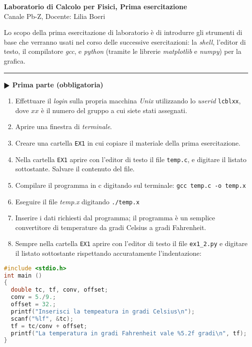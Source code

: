 \documentclass[11pt]{article}
\begin{document}
\pagestyle{empty}

\begin{center}
{\Large \bf  Laboratorio di Calcolo per Fisici, Prima esercitazione\\[2mm]}
{\large Canale Pb-Z, Docente: Lilia Boeri}
\end{center}
\vspace{4mm}

\begin{mdframed}[backgroundcolor=panna]
  Lo scopo della prima esercitazione di laboratorio \`e di introdurre gli strumenti di base che verranno usati nel corso delle successive esercitazioni:
  la {\em shell}, l'editor di testo, il compilatore {\em gcc}, e {\em python\/} (tramite le librerie
  {\em matplotlib\/} e {\em numpy\/}) per la grafica.
\\
\end{mdframed}
%
%

\hrule
\vspace{2mm}
\textbf{$\RHD$ Prima parte (obbligatoria)} 
\begin{enumerate}
\item Effettuare il {\em login\/} sulla propria macchina {\em Unix\/} utilizzando lo {\em userid\/} \texttt{lcblxx}, 
dove $xx$ \`e il numero del gruppo a cui siete stati assegnati.
\item Aprire una finestra di {\em terminale}.
\item Creare una cartella  \texttt{EX1} in cui copiare il materiale della prima esercitazione.
\item Nella cartella \texttt{EX1} aprire con l'editor di testo il file \texttt{temp.c}, e digitare il listato sottostante. Salvare il contenuto del file.

\item Compilare il programma in c digitando sul terminale:
  \texttt{gcc temp.c -o temp.x}
\item Eseguire il file {\em temp.x\/} digitando \texttt{./temp.x}
\item Inserire i dati richiesti dal programma; il programma \`e un semplice convertitore di temperature da gradi Celsius a gradi Fahrenheit.
\item Sempre nella cartella \texttt{EX1} aprire con l'editor di testo il file \texttt{ex1\_2.py} e digitare il listato
  sottostante rispettando accuratamente l'indentazione:
\end{enumerate}
\begin{lstlisting}[caption={Programma \texttt{temp.c}},language=c]
#include <stdio.h>
int main ()
{
  double tc, tf, conv, offset;
  conv = 5./9.;
  offset = 32.;
  printf("Inserisci la tempeatura in gradi Celsius\n");
  scanf("%lf", &tc);
  tf = tc/conv + offset;
  printf("La temperatura in gradi Fahrenheit vale %5.2f gradi\n", tf);
}
\end{lstlisting}
\end{document}

